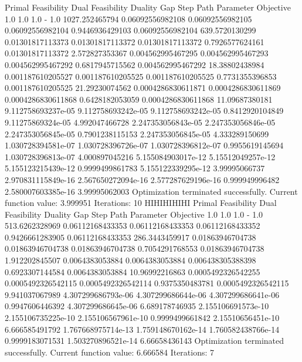 \documentclass[letterpaper,10pt,english]{sphinxmanual}
\begin{document}
{\begin{sphinxVerbatim}[commandchars=\\\{\}]
Primal Feasibility  Dual Feasibility    Duality Gap         Step             Path Parameter      Objective
1.0                 1.0                 1.0                 -                1.0                 1027.252465794
0.06092556982108    0.06092556982105    0.06092556982104    0.9446936429103  0.06092556982104    639.5720130299
0.01301817113373    0.01301817113372    0.01301817113372    0.7926577624161  0.01301817113372    2.572827353367
0.004562995467295   0.004562995467293   0.004562995467292   0.6817945715562  0.004562995467292   18.38802438984
0.001187610205527   0.001187610205525   0.001187610205525   0.7731355396853  0.001187610205525   21.29230074562
0.0004286830611871  0.0004286830611869  0.0004286830611868  0.6428182053059  0.0004286830611868  11.09687380181
9.112758693237e-05  9.112758693242e-05  9.112758693242e-05  0.8412920104849  9.11275869324e-05   4.992047466728
2.247353056843e-05  2.247353056846e-05  2.247353056845e-05  0.7901238115153  2.247353056845e-05  4.333289150699
1.030728394581e-07  1.030728396726e-07  1.030728396812e-07  0.9955619145694  1.030728396813e-07  4.000897045216
5.155084903017e-12  5.15512049257e-12   5.155123215439e-12  0.9999499861783  5.155122339295e-12  3.99995066737
2.970831115849e-16  2.567650272094e-16  2.577287629196e-16  0.999949996482   2.580007603385e-16  3.99995062003
Optimization terminated successfully.
         Current function value: 3.999951
         Iterations: 10
HIHIHIHIHI
Primal Feasibility  Dual Feasibility    Duality Gap         Step             Path Parameter      Objective
1.0                 1.0                 1.0                 -                1.0                 513.6262328969
0.06112168433353    0.06112168433353    0.06112168433352    0.9426661283905  0.06112168433353    286.3443459917
0.01863946704738    0.01863946704738    0.01863946704738    0.7054291768553  0.01863946704738    1.912202845507
0.0064383053884     0.0064383053884     0.006438305388398   0.6923307144584  0.0064383053884     10.96992216863
0.0005492326542255  0.0005492326542115  0.0005492326542114  0.9375350483781  0.0005492326542115  9.941037067989
4.307299686793e-06  4.307299686644e-06  4.307299686641e-06  0.9947606446392  4.307299686645e-06  6.689178746935
2.155106691573e-10  2.155106735225e-10  2.155106567961e-10  0.9999499661842  2.15510656451e-10   6.666585491792
1.767668975714e-13  1.759148670162e-14  1.760582438766e-14  0.9999183071531  1.503270896521e-14  6.66658436143
Optimization terminated successfully.
         Current function value: 6.666584
         Iterations: 7
\end{sphinxVerbatim}
}
\end{document}
